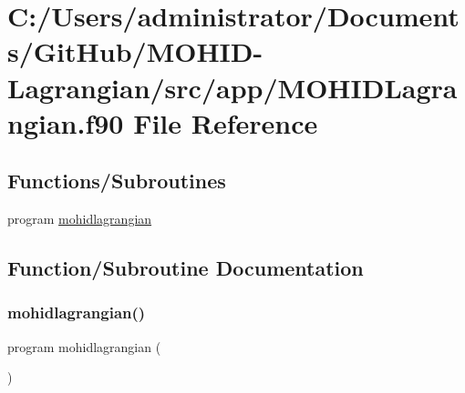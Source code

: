 \hypertarget{_m_o_h_i_d_lagrangian_8f90}{}\section{C\+:/\+Users/administrator/\+Documents/\+Git\+Hub/\+M\+O\+H\+I\+D-\/\+Lagrangian/src/app/\+M\+O\+H\+I\+D\+Lagrangian.f90 File Reference}
\label{_m_o_h_i_d_lagrangian_8f90}
\subsection*{Functions/\+Subroutines}
\begin{DoxyCompactItemize}
\item 
program \hyperlink{_m_o_h_i_d_lagrangian_8f90_afb8cd544871a8dba29f3eac2f03477d2}{mohidlagrangian}
\end{DoxyCompactItemize}


\subsection{Function/\+Subroutine Documentation}
\mbox{\label{_m_o_h_i_d_lagrangian_8f90_afb8cd544871a8dba29f3eac2f03477d2}} 
\subsubsection{\texorpdfstring{mohidlagrangian()}{mohidlagrangian()}}
{\footnotesize\ttfamily program mohidlagrangian (\begin{DoxyParamCaption}{ }\end{DoxyParamCaption})}

